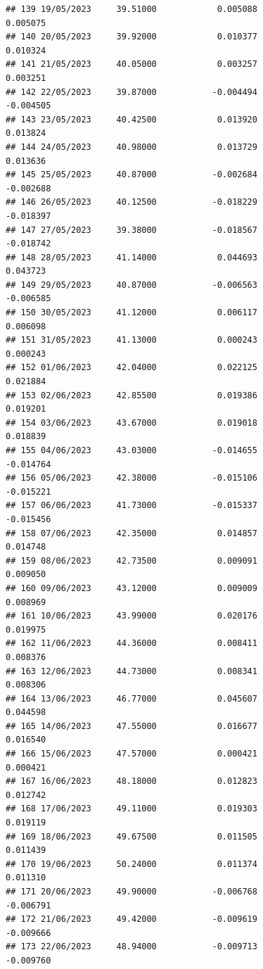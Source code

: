 \documentclass[
]{article}
\begin{document}
\begin{verbatim}
## 139 19/05/2023     39.51000            0.005088                0.005075
## 140 20/05/2023     39.92000            0.010377                0.010324
## 141 21/05/2023     40.05000            0.003257                0.003251
## 142 22/05/2023     39.87000           -0.004494               -0.004505
## 143 23/05/2023     40.42500            0.013920                0.013824
## 144 24/05/2023     40.98000            0.013729                0.013636
## 145 25/05/2023     40.87000           -0.002684               -0.002688
## 146 26/05/2023     40.12500           -0.018229               -0.018397
## 147 27/05/2023     39.38000           -0.018567               -0.018742
## 148 28/05/2023     41.14000            0.044693                0.043723
## 149 29/05/2023     40.87000           -0.006563               -0.006585
## 150 30/05/2023     41.12000            0.006117                0.006098
## 151 31/05/2023     41.13000            0.000243                0.000243
## 152 01/06/2023     42.04000            0.022125                0.021884
## 153 02/06/2023     42.85500            0.019386                0.019201
## 154 03/06/2023     43.67000            0.019018                0.018839
## 155 04/06/2023     43.03000           -0.014655               -0.014764
## 156 05/06/2023     42.38000           -0.015106               -0.015221
## 157 06/06/2023     41.73000           -0.015337               -0.015456
## 158 07/06/2023     42.35000            0.014857                0.014748
## 159 08/06/2023     42.73500            0.009091                0.009050
## 160 09/06/2023     43.12000            0.009009                0.008969
## 161 10/06/2023     43.99000            0.020176                0.019975
## 162 11/06/2023     44.36000            0.008411                0.008376
## 163 12/06/2023     44.73000            0.008341                0.008306
## 164 13/06/2023     46.77000            0.045607                0.044598
## 165 14/06/2023     47.55000            0.016677                0.016540
## 166 15/06/2023     47.57000            0.000421                0.000421
## 167 16/06/2023     48.18000            0.012823                0.012742
## 168 17/06/2023     49.11000            0.019303                0.019119
## 169 18/06/2023     49.67500            0.011505                0.011439
## 170 19/06/2023     50.24000            0.011374                0.011310
## 171 20/06/2023     49.90000           -0.006768               -0.006791
## 172 21/06/2023     49.42000           -0.009619               -0.009666
## 173 22/06/2023     48.94000           -0.009713               -0.009760

\end{verbatim}
\end{document}
